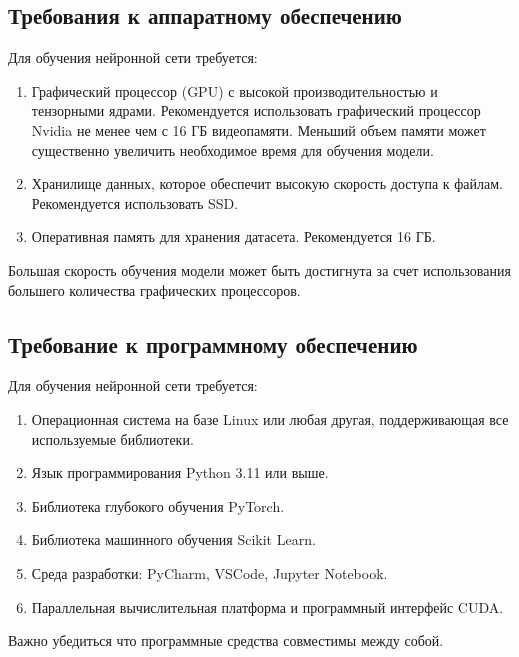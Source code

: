 \documentclass[../part_2.tex]{subfiles}
\begin{document}
\subsection{Требования к аппаратному обеспечению}
\par Для обучения нейронной сети требуется:
\begin{enumerate}
    \item Графический процессор (GPU) с высокой производительностью и тензорными ядрами. Рекомендуется использовать графический процессор Nvidia не менее чем с 16 ГБ видеопамяти. Меньший объем памяти может существенно увеличить необходимое время для обучения модели.
    \item Хранилище данных, которое обеспечит высокую скорость доступа к файлам. Рекомендуется использовать SSD.
    \item Оперативная память для хранения датасета. Рекомендуется 16 ГБ.
\end{enumerate}
\par Большая скорость обучения модели может быть достигнута за счет использования большего количества графических процессоров.
\subsection{Требование к программному обеспечению}
\par Для обучения нейронной сети требуется:
\begin{enumerate}
    \item Операционная система на базе Linux или любая другая, поддерживающая все используемые библиотеки.
    \item Язык программирования Python 3.11 или выше.
    \item Библиотека глубокого обучения PyTorch.
    \item Библиотека машинного обучения Scikit Learn.
    \item Среда разработки: PyCharm, VSCode, Jupyter Notebook.
    \item Параллельная вычислительная платформа и программный интерфейс CUDA.
\end{enumerate}
\par Важно убедиться что программные средства совместимы между собой.
\end{document}
